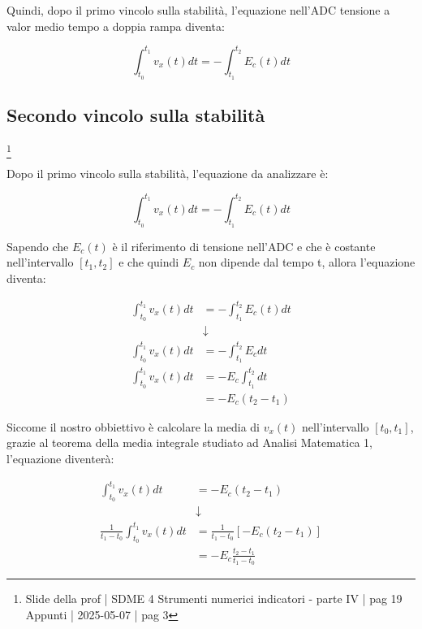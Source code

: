 Quindi, dopo il primo vincolo sulla stabilità, 
l'equazione nell'ADC tensione a valor medio tempo a doppia rampa diventa:

{
    \Large 
    \begin{equation}
        \int_{t_0}^{t_1} v_x(t) dt 
        =
        -
        \int_{t_1}^{t_2} E_c (t) dt
    \end{equation}
}


\newpage 

\subsection{Secondo vincolo sulla stabilità}
\footnote{Slide della prof | SDME 4 Strumenti numerici indicatori - parte IV | pag 19\\  
Appunti | 2025-05-07 | pag 3}

Dopo il primo vincolo sulla stabilità, l'equazione da analizzare è: 

{
    \Large 
    \begin{equation}
        \int_{t_0}^{t_1} v_x(t) dt 
        =
        -
        \int_{t_1}^{t_2} E_c (t) dt
    \end{equation}
}

Sapendo che $E_c(t)$ è il riferimento di tensione nell'ADC e che è costante nell'intervallo $[t_1, t_2]$ e che quindi $E_c$ non dipende dal tempo t, 
allora l'equazione diventa: 

{
    \Large 
    \begin{equation}
        \begin{split}
        \int_{t_0}^{t_1} v_x(t) dt 
        &=
        -
        \int_{t_1}^{t_2} E_c (t) dt
        \\
        &\downarrow
        \\
        \int_{t_0}^{t_1} v_x(t) dt 
        &=
        -
        \int_{t_1}^{t_2} E_c dt
        \\
        \int_{t_0}^{t_1} v_x(t) dt 
        &=
        - E_c
        \int_{t_1}^{t_2}  dt
        \\
        &= 
        -E_c (t_2 - t_1)
        \end{split}
    \end{equation}
}

Siccome il nostro obbiettivo è calcolare la media di $v_x(t)$ nell'intervallo $[t_0, t_1]$, 
grazie al teorema della media integrale studiato ad Analisi Matematica 1, l'equazione diventerà:

{
    \Large 
    \begin{equation}
        \begin{split}
          \int_{t_0}^{t_1} v_x(t) dt 
        &=  
        -E_c (t_2 - t_1)
        \\
        &\downarrow
        \\
        \frac{1}{t_1 - t_0}
        \int_{t_0}^{t_1} v_x(t) dt 
        &=  
        \frac{1}{t_1 - t_0}
        \left[
        -E_c (t_2 - t_1)
        \right]
        \\
        &=  
        -E_c 
        \frac{t_2 - t_1}{t_1 - t_0}
        \end{split}
    \end{equation}
}

